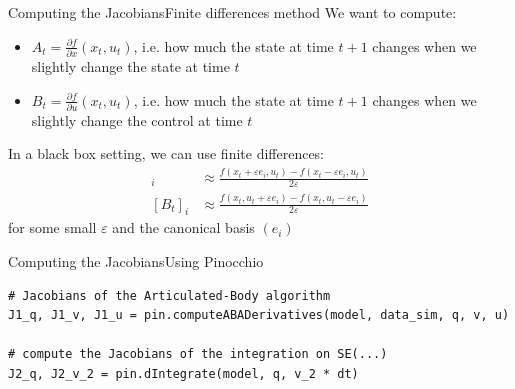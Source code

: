 \documentclass[aspectratio=169]{beamer}
\begin{document}
\begin{frame}{Computing the Jacobians}{Finite differences method}
    We want to compute:
    \begin{itemize}
        \item $A_t=\frac{\partial f}{\partial x}(x_t, u_t)$, i.e. how much the state at time $t+1$ changes when we slightly change the state at time $t$
        \item $B_t=\frac{\partial f}{\partial u}(x_t, u_t)$, i.e. how much the state at time $t+1$ changes when we slightly change the control at time $t$
    \end{itemize}
    In a black box setting, we can use finite differences:
    \begin{align*}
        [A_t]_i & \approx \frac{f(x_t+\varepsilon e_i, u_t)-f(x_t-\varepsilon e_i, u_t)}{2\varepsilon} \\
        [B_t]_i & \approx \frac{f(x_t, u_t+\varepsilon e_i)-f(x_t, u_t-\varepsilon e_i)}{2\varepsilon}
    \end{align*}
    for some small $\varepsilon$ and the canonical basis $(e_i)$
\end{frame}

\begin{frame}[fragile]{Computing the Jacobians}{Using Pinocchio}
    \begin{verbatim}
# Jacobians of the Articulated-Body algorithm
J1_q, J1_v, J1_u = pin.computeABADerivatives(model, data_sim, q, v, u)

# compute the Jacobians of the integration on SE(...)
J2_q, J2_v_2 = pin.dIntegrate(model, q, v_2 * dt)
    \end{verbatim}
\end{frame}
\end{document}

